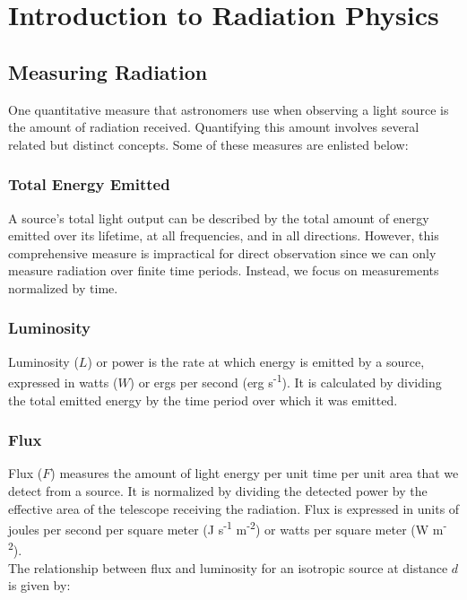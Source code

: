 \chapter{Introduction to Radiation Physics}

\section{Measuring Radiation}

One quantitative measure that astronomers use when observing a light source is the amount of radiation received. Quantifying this amount involves several related but distinct concepts. Some of these measures are enlisted below:

\subsection{Total Energy Emitted}

A source's total light output can be described by the total amount of energy emitted over its lifetime, at all frequencies, and in all directions. However, this comprehensive measure is impractical for direct observation since we can only measure radiation over finite time periods. Instead, we focus on measurements normalized by time.

\subsection{Luminosity}

Luminosity ($L$) or power is the rate at which energy is emitted by a source, expressed in watts ($W$) or ergs per second (erg s\textsuperscript{-1}). It is calculated by dividing the total emitted energy by the time period over which it was emitted.

\subsection{Flux}

Flux ($F$) measures the amount of light energy per unit time per unit area that we detect from a source. It is normalized by dividing the detected power by the effective area of the telescope receiving the radiation. Flux is expressed in units of joules per second per square meter (J s\textsuperscript{-1} m\textsuperscript{-2}) or watts per square meter (W m\textsuperscript{-2}). \\

The relationship between flux and luminosity for an isotropic source at distance \( d \) is given by:

